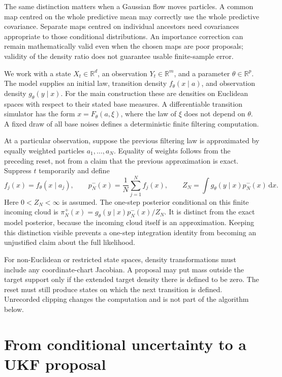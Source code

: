 \documentclass[11pt,a4paper]{article}
\newcommand{\R}{\mathbb R}
\newcommand{\dd}{\mathrm d}
\begin{document}
The same distinction matters when a Gaussian flow moves particles. A common
map centred on the whole predictive mean may correctly use the whole
predictive covariance. Separate maps centred on individual ancestors need
covariances appropriate to those conditional distributions. An importance
correction can remain mathematically valid even when the chosen maps are
poor proposals; validity of the density ratio does not guarantee usable
finite-sample error.

We work with a state \(X_t\in\R^d\), an observation \(Y_t\in\R^m\), and a parameter
\(\theta\in\R^p\). The model supplies an initial law, transition density
\(f_\theta(x\mid a)\), and observation density \(g_\theta(y\mid x)\).
For the main construction these are densities on Euclidean spaces with
respect to their stated base measures. A differentiable transition simulator
has the form \(x=F_\theta(a,\xi)\), where the law of \(\xi\) does not depend
on \(\theta\). A fixed draw of all base noises defines a deterministic
finite filtering computation.

At a particular observation, suppose the previous filtering law is
approximated by equally weighted particles \(a_1,\ldots,a_N\). Equality of
weights follows from the preceding reset, not from a claim that the previous
approximation is exact. Suppress \(t\) temporarily and define
\begin{equation}
\label{eq:finite-target}
 f_j(x)=f_\theta(x\mid a_j),\qquad
 p_N^-(x)=\frac1N\sum_{j=1}^N f_j(x),\qquad
 Z_N=\int g_\theta(y\mid x)p_N^-(x)\,\dd x .
\end{equation}
Here \(0<Z_N<\infty\) is assumed. The one-step posterior conditional on this
finite incoming cloud is
\(\pi_N^+(x)=g_\theta(y\mid x)p_N^-(x)/Z_N\).
It is distinct from the exact model posterior, because the incoming cloud
itself is an approximation. Keeping this distinction visible prevents a
one-step integration identity from becoming an unjustified claim about the
full likelihood.

For non-Euclidean or restricted state spaces, density transformations must
include any coordinate-chart Jacobian. A proposal may put mass outside the
target support only if the extended target density there is defined to be
zero. The reset must still produce states on which the next transition is
defined. Unrecorded clipping changes the computation and is not part of the
algorithm below.

\section{From conditional uncertainty to a UKF proposal}
\end{document}

